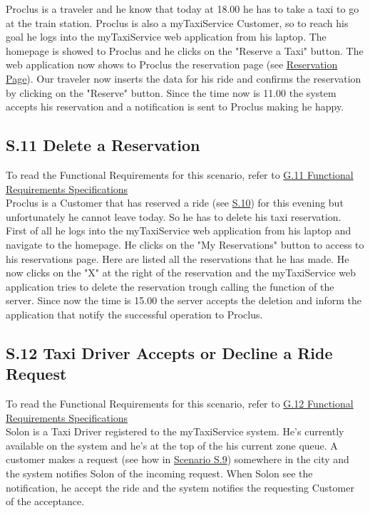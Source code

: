		Proclus is a traveler and he know that today at 18.00 he has to take a taxi to go at the train station. Proclus is also a myTaxiService Customer, so to reach his goal he logs into the myTaxiService web application from his laptop. The homepage is showed to Proclus and he clicks on the "Reserve a Taxi" button. The web application now shows to Proclus the reservation page (see \hyperref[reservation_w]{Reservation Page}).
		Our traveler now inserts the data for his ride and confirms the reservation by clicking on the "Reserve" button. Since the time now is 11.00 the system accepts his reservation and a notification is sent to Proclus making he happy.

		\subsection{S.11 Delete a Reservation}\label{sec:ReservationDeletionScenario}
		To read the Functional Requirements for this scenario, refer to \hyperref[sec:frs11]{G.11 Functional Requirements Specifications}\\

		Proclus is a Customer that has reserved a ride (see \hyperref[sec:TaxiReservationScenario]{S.10}) for this evening but unfortunately he cannot leave today. So he has to delete his taxi reservation. First of all he logs into the myTaxiService web application from his laptop and navigate to the homepage. He clicks on the "My Reservations" button to access to his reservations page. Here are listed all the reservations that he has made. He now clicks on the "X" at the right of the reservation and the myTaxiService web application tries to delete the reservation trough calling the function of the server. Since now the time is 15.00 the server accepts the deletion and inform the application that notify the successful operation to Proclus.

		\subsection{S.12 Taxi Driver Accepts or Decline a Ride Request}\label{sec:RequestAcceptDeclineScenario}
		To read the Functional Requirements for this scenario, refer to \hyperref[sec:frs12]{G.12 Functional Requirements Specifications}\\

		Solon is a Taxi Driver registered to the myTaxiService system. He's currently available on the system and he's at the top of the his current zone queue. A customer makes a request (see how in \hyperref[sec:TaxiRequiringScenario]{Scenario S.9}) somewhere in the city and the system notifies Solon of the incoming request. When Solon see the notification, he accept the ride and the system notifies the requesting Customer of the acceptance.

